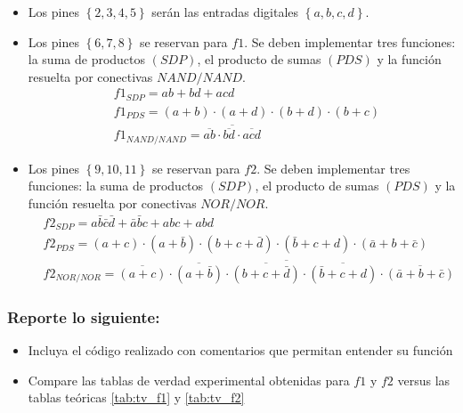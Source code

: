 \begin{itemize}
\begin{table}[H]
    \end{table}
    \item Los pines $\left\lbrace 2,3,4,5\right\rbrace$ serán las entradas digitales $\left\lbrace a,b,c,d\right\rbrace$.
    \item Los pines $\left\lbrace 6,7,8\right\rbrace $ se reservan para $f1$. Se deben implementar tres funciones: la suma de productos $(SDP)$, el producto de sumas $(PDS)$ y la función resuelta por conectivas $NAND/NAND$. 
    \begin{align*}
        &f1_{SDP} = ab + bd + acd\\
        &f1_{PDS} = (a+b)\cdot (a+d)\cdot (b+d)\cdot (b+c)\\
        &f1_{NAND/NAND} = \overline{\overline{ab} \cdot \overline{bd} \cdot \overline{acd}}
    \end{align*}
    \item Los pines $\left\lbrace 9,10,11\right\rbrace $ se reservan para $f2$. Se deben implementar tres funciones: la suma de productos $(SDP)$, el producto de sumas $(PDS)$ y la función resuelta por conectivas $NOR/NOR$.
    \begin{align*}
        &f2_{SDP} = a\bar{b}\bar{c}\bar{d} + \bar{a}\bar{b}c + abc + abd\\
        &f2_{PDS} = (a+c)\cdot (a+\bar{b})\cdot(b+c+\bar{d})\cdot(\bar{b}+c+d)\cdot (\bar{a}+b+\bar{c})\\
        &f2_{NOR/NOR} = \overline{\overline{(a+c)}\cdot \overline{(a+\bar{b})}\cdot \overline{(b+c+\bar{d})} \cdot \overline{(\bar{b}+c+d)} \cdot \overline{(\bar{a}+b+\bar{c})}}
    \end{align*}
\end{itemize}
 
\subsubsection{Reporte lo siguiente:}

\begin{itemize}
    \item Incluya el código realizado con comentarios que permitan entender su función
    \item Compare las tablas de verdad experimental obtenidas para $f1$ y $f2$ versus las tablas teóricas \ref{tab:tv_f1} y \ref{tab:tv_f2}
\end{itemize}


